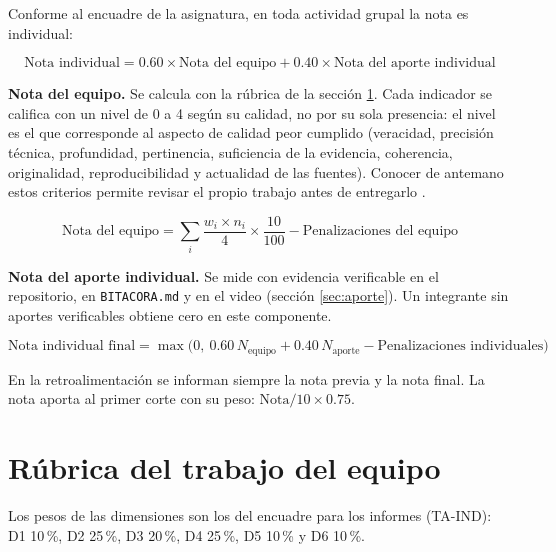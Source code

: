 \documentclass[11pt,a4paper]{article}
\begin{document}
Conforme al encuadre de la asignatura, en toda actividad grupal la nota es individual:

\[ \text{Nota individual} = 0.60 \times \text{Nota del equipo} + 0.40 \times \text{Nota del aporte individual} \]

\textbf{Nota del equipo.} Se calcula con la rúbrica de la sección \ref{sec:rubrica}. Cada indicador se califica con un nivel de 0 a 4 según su calidad, no por su sola presencia: el nivel es el que corresponde al aspecto de calidad peor cumplido (veracidad, precisión técnica, profundidad, pertinencia, suficiencia de la evidencia, coherencia, originalidad, reproducibilidad y actualidad de las fuentes). Conocer de antemano estos criterios permite revisar el propio trabajo antes de entregarlo \cite{panadero2020critical,brookhart2018appropriate}.

\[ \text{Nota del equipo} = \sum_{i} \frac{w_i \times n_i}{4} \times \frac{10}{100} - \text{Penalizaciones del equipo} \]

\textbf{Nota del aporte individual.} Se mide con evidencia verificable en el repositorio, en \texttt{BITACORA.md} y en el video (sección \ref{sec:aporte}). Un integrante sin aportes verificables obtiene cero en este componente.

\[ \text{Nota individual final} = \max\bigl(0,\ 0.60\,N_{\text{equipo}} + 0.40\,N_{\text{aporte}} - \text{Penalizaciones individuales}\bigr) \]

En la retroalimentación se informan siempre la nota previa y la nota final. La nota aporta al primer corte con su peso: $\text{Nota}/10 \times 0.75$.

\section{Rúbrica del trabajo del equipo}\label{sec:rubrica}

Los pesos de las dimensiones son los del encuadre para los informes (TA-IND): D1 10\,\%, D2 25\,\%, D3 20\,\%, D4 25\,\%, D5 10\,\% y D6 10\,\%.
\end{document}
